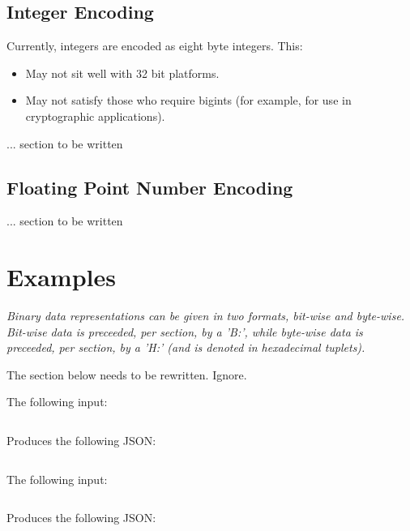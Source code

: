 \subsection{Integer Encoding}

Currently, integers are encoded as eight byte integers. This:

\begin{itemize}
\item May not sit well with 32 bit platforms.
\item May not satisfy those who require bigints (for example, for use in
      cryptographic applications).
\end{itemize}

... section to be written

\subsection{Floating Point Number Encoding}

... section to be written

\section{Examples}

\textit{
Binary data representations can be given in two formats, bit-wise and byte-wise.
Bit-wise data is preceeded, per section, by a 'B:',
while byte-wise data is preceeded, per section, by a 'H:' (and is denoted in
hexadecimal tuplets).
}

The section below needs to be rewritten. Ignore.

The following input:

\begin{changemargin}{-60mm}{0mm}
\begin{myquote}
\begin{verbatim}
\end{verbatim}
\end{myquote}
\end{changemargin}

Produces the following JSON:

\begin{changemargin}{-60mm}{0mm}
\begin{myquote}
\begin{verbatim}
\end{verbatim}
\end{myquote}
\end{changemargin}

The following input:

\begin{changemargin}{-60mm}{0mm}
\begin{myquote}
\begin{verbatim}
\end{verbatim}
\end{myquote}
\end{changemargin}

Produces the following JSON:

\begin{changemargin}{-60mm}{0mm}
\begin{myquote}
\begin{verbatim}
\end{verbatim}
\end{myquote}
\end{changemargin}


